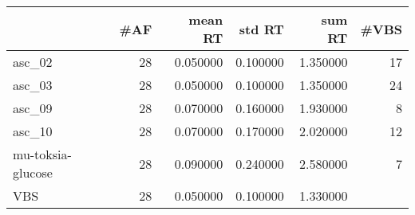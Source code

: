 \begin{tabular}{lrrrrr}
\toprule
 & #AF & mean RT & std RT & sum RT & #VBS \\
\midrule
asc_02 & 28 & 0.050000 & 0.100000 & 1.350000 & 17 \\
asc_03 & 28 & 0.050000 & 0.100000 & 1.350000 & 24 \\
asc_09 & 28 & 0.070000 & 0.160000 & 1.930000 & 8 \\
asc_10 & 28 & 0.070000 & 0.170000 & 2.020000 & 12 \\
mu-toksia-glucose & 28 & 0.090000 & 0.240000 & 2.580000 & 7 \\
VBS & 28 & 0.050000 & 0.100000 & 1.330000 &  \\
\bottomrule
\end{tabular}
